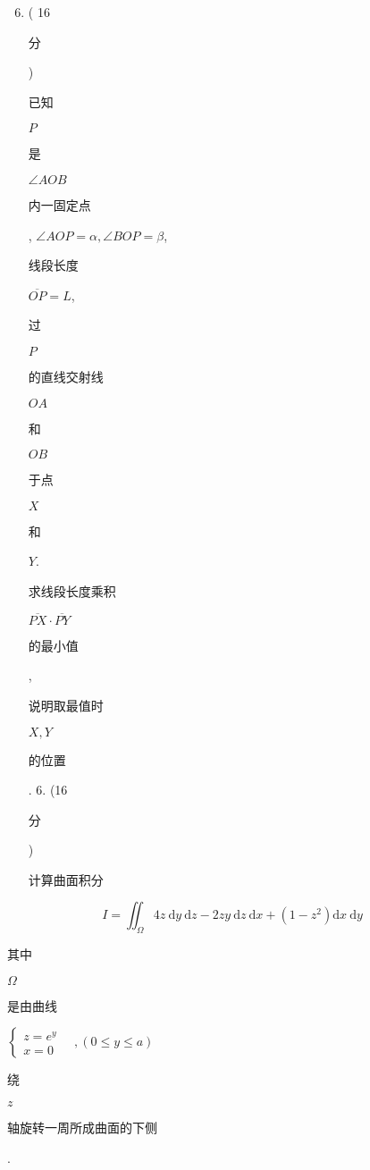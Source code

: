 \documentclass[10pt]{article}
\begin{document}
\begin{enumerate}
  \setcounter{enumi}{5}
  \item ( 16 \begin{CJK}{UTF8}{mj}分\end{CJK}) \begin{CJK}{UTF8}{mj}已知\end{CJK} $P$ \begin{CJK}{UTF8}{mj}是\end{CJK} $\angle A O B$ \begin{CJK}{UTF8}{mj}内一固定点\end{CJK}, $\angle A O P=\alpha, \angle B O P=\beta$, \begin{CJK}{UTF8}{mj}线段长度\end{CJK} $\overline{O P}=L$, \begin{CJK}{UTF8}{mj}过\end{CJK} $P$ \begin{CJK}{UTF8}{mj}的直线交射线\end{CJK} $O A$ \begin{CJK}{UTF8}{mj}和\end{CJK} $O B$ \begin{CJK}{UTF8}{mj}于点\end{CJK} $X$ \begin{CJK}{UTF8}{mj}和\end{CJK} $Y$. \begin{CJK}{UTF8}{mj}求线段长度乘积\end{CJK} $\overline{P X} \cdot \overline{P Y}$ \begin{CJK}{UTF8}{mj}的最小值\end{CJK}, \begin{CJK}{UTF8}{mj}说明取最值时\end{CJK} $X, Y$ \begin{CJK}{UTF8}{mj}的位置\end{CJK}. 6. (16 \begin{CJK}{UTF8}{mj}分\end{CJK}) \begin{CJK}{UTF8}{mj}计算曲面积分\end{CJK}
\end{enumerate}
$$
I=\iint_{\Omega} 4 z \mathrm{~d} y \mathrm{~d} z-2 z y \mathrm{~d} z \mathrm{~d} x+\left(1-z^{2}\right) \mathrm{d} x \mathrm{~d} y
$$
\begin{CJK}{UTF8}{mj}其中\end{CJK} $\Omega$ \begin{CJK}{UTF8}{mj}是由曲线\end{CJK} $\left\{\begin{array}{c}z=e^{y} \\ x=0\end{array} \quad,(0 \leq y \leq a)\right.$ \begin{CJK}{UTF8}{mj}绕\end{CJK} $z$ \begin{CJK}{UTF8}{mj}轴旋转一周所成曲面的下侧\end{CJK}.
\end{document}
